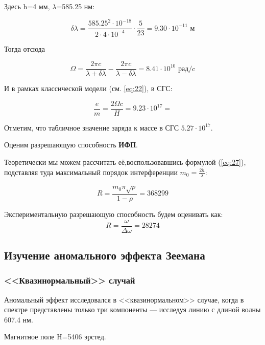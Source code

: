 Здесь h=4 мм,  $\lambda$=585.25 нм:

\begin{equation}
 	\delta \lambda=\frac{585.25^2\cdot10^{-18}}{2\cdot4\cdot10^{-4}}\cdot\frac{5}{23}=9.30\cdot10^{-11} \text{ м}
 \end{equation} 

Тогда отсюда

\begin{equation}
	\Omega=\frac{2\pi c}{\lambda+\delta \lambda}-\frac{2\pi c}{\lambda-\delta \lambda}=8.41\cdot10^{10} \text{ рад/c}
\end{equation}

И в рамках классической модели (см. \ref{eq:22}), в СГС:

\begin{equation}
	\frac{e}{m}=\frac{2\Omega c}{H}=9.23\cdot10^{17}=
\end{equation}

Отметим, что табличное значение заряда к массе в СГС $5.27\cdot10^{17}$.

Оценим разрешающую способность \textbf{ИФП}. 

Теоретически мы можем рассчитать её,воспользовавшись формулой (\ref{eq:27}), подставляя туда максимальный порядок интерференции $m_0=\frac{2h}{\lambda}$: 

\begin{equation} 
R=\frac{m_0\pi\sqrt{\rho}}{1-\rho}=368299 
\end{equation} 

Экспериментальную разрешающую способность будем оценивать как: 
\begin{equation} 
R=\frac{\omega}{\Delta \omega}=28274 
\end{equation}

\subsection{Изучение аномального эффекта Зеемана}

\subsubsection{<<Квазинормальный>> случай}

Аномальный эффект исследовался в <<квазинормальном>> случае, когда в спектре представлены только три компоненты --- исследуя линию с  длиной волны  607.4 нм.

Магнитное поле H=5406 эрстед.

